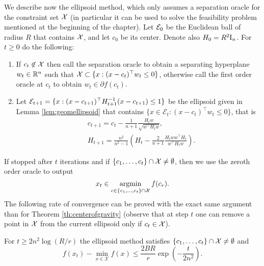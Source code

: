 We describe now the ellipsoid method, which only assumes a separation oracle for the constraint set $\mathcal{X}$ (in particular it can be used to solve the feasibility problem mentioned at the beginning of the chapter). 
Let $\mathcal{E}_0$ be the Euclidean ball of radius $R$ that contains $\mathcal{X}$, and let $c_0$ be its center. Denote also $H_0=R^2 \mathrm{I}_n$. For $t \geq 0$ do the following:
\begin{enumerate}
\item If $c_t \not\in \mathcal{X}$ then call the separation oracle to obtain a separating hyperplane $w_t \in \mathbb{R}^n$ such that $\mathcal{X} \subset \{x : (x- c_t)^{\top} w_t \leq 0\}$, otherwise call the first order oracle at $c_t$ to obtain $w_t \in \partial f (c_t)$. 
\item Let $\mathcal{E}_{t+1} = \{x : (x - c_{t+1})^{\top} H_{t+1}^{-1} (x-c_{t+1}) \leq 1 \}$ be the ellipsoid given in Lemma \ref{lem:geomellipsoid} that contains $\{x \in \mathcal{E}_t : (x- c_t)^{\top} w_t \leq 0\}$, that is
\begin{align*}
& c_{t+1} = c_{t} - \frac{1}{n+1} \frac{H_t w}{\sqrt{w^{\top} H_t w}} ,\\
& H_{t+1} = \frac{n^2}{n^2-1} \left(H_t - \frac{2}{n+1} \frac{H_t w w^{\top} H_t}{w^{\top} H_t w} \right) .
\end{align*}
\end{enumerate}
If stopped after $t$ iterations and if $\{c_1, \hdots, c_t\} \cap \mathcal{X} \neq \emptyset$, then we use the zeroth order oracle to output
$$x_t\in \mathop{\mathrm{argmin}}_{c \in \{c_1, \hdots, c_t\} \cap \mathcal{X}} f(c_r) .$$
The following rate of convergence can be proved with the exact same argument than for Theorem \ref{th:centerofgravity} (observe that at step $t$ one can remove a point in $\mathcal{X}$ from the current ellipsoid only if $c_t \in \mathcal{X}$).
\begin{theorem}
For $t \geq 2n^2 \log(R/r)$ the ellipsoid method satisfies $\{c_1, \hdots, c_t\} \cap \mathcal{X} \neq \emptyset$ and
$$f(x_t) - \min_{x \in \mathcal{X}} f(x) \leq \frac{2 B R}{r} \exp\left( - \frac{t}{2 n^2}\right) .$$
\end{theorem}
